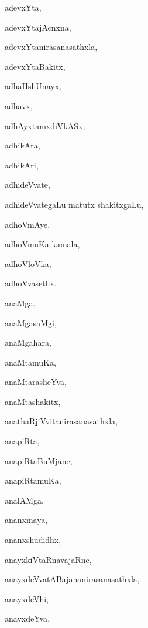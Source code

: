 \begin{multicols}{2}
{adevxYta}, \pageref{adevxYta}

{adevxYtajAcnxna}, \pageref{adevxYtajAcnxna}

{adevxYtanirasanasathxla}, \pageref{adevxYtanirasanasathxla}

{adevxYtaBakitx}, \pageref{adevxYtaBakitx}

{adhaHshUnayx}, \pageref{adhaHshUnayx}

{adhavx}, \pageref{adhavx}

{adhAyxtamxdiVkASx}, \pageref{adhAyxtamxdiVkASx}

{adhikAra}, \pageref{adhikAra}

{adhikAri}, \pageref{adhikAri}

{adhideVvate}, \pageref{adhideVvate}

{adhideVvategaLu matutx shakitxgaLu}, \pageref{adhideVvategaLu matutx shakitxgaLu}

{adhoVmAye}, \pageref{adhoVmAye}

{adhoVmuKa kamala}, \pageref{adhoVmuKa kamala}

{adhoVloVka}, \pageref{adhoVloVka}

{adhoVvasethx}, \pageref{adhoVvasethx}

{anaMga}, \pageref{anaMga}

{anaMgasaMgi}, \pageref{anaMgasaMgi}

{anaMgahara}, \pageref{anaMgahara}

{anaMtamuKa}, \pageref{anaMtamuKa}

{anaMtarasheYva}, \pageref{anaMtarasheYva}

{anaMtashakitx}, \pageref{anaMtashakitx}

{anathaRjiVvitanirasanasathxla}, \pageref{anathaRjiVvitanirasanasathxla}

{anapiRta}, \pageref{anapiRta}

{anapiRtaBuMjane}, \pageref{anapiRtaBuMjane}

{anapiRtamuKa}, \pageref{anapiRtamuKa}

{analAMga}, \pageref{analAMga}

{ananxmaya}, \pageref{ananxmaya}

{ananxshudidhx}, \pageref{ananxshudidhx}

{anayxkiVtaRnavajaRne}, \pageref{anayxkiVtaRnavajaRne}

{anayxdeVvatABajananirasanasathxla}, \pageref{anayxdeVvatABajananirasanasathxla}

{anayxdeVhi}, \pageref{anayxdeVhi}

{anayxdeYva}, \pageref{anayxdeYva}


\end{multicols}
